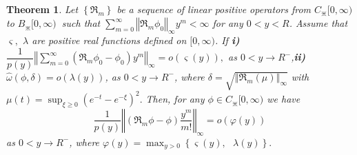 \documentclass{amsart}
\newtheorem{theorem}{Theorem}
\theoremstyle{plain}
\numberwithin{equation}{section}
\begin{document}
\begin{theorem}
\label{rate1} Let $\left \{  \Re_{m}\right \}  $ be a sequence of linear
positive operators from $C_{\divideontimes}[0,\infty)$ to $B_{\divideontimes
}[0,\infty)\ $ such that $%
{\displaystyle \sum \limits_{m=0}^{\infty}}
\left \Vert \Re_{m}\phi_{0}\right \Vert _{\infty}y^{m}<\infty$ for any $0<y<R$.
Assume that $\varsigma,$ $\lambda$ are positive real functions defined on
$[0,\infty)$. If \newline \textbf{i)} $\dfrac{1}{p(y)}\left \Vert
\displaystyle \sum_{m=0}^{\infty}(\Re_{m}\phi_{0}-\phi_{0})y^{m}\right \Vert
_{\infty}=o(\varsigma(y)),$ as $0<y\rightarrow R^{-}$,\newline \textbf{ii)
}$\hat{\omega}(\phi,\delta)=o(\lambda(y))$, as $0<y\rightarrow R^{-}$, where
$\delta=\sqrt{\left \Vert \Re_{m}\left(  \mu\right)  \right \Vert
_{\infty}}$ with $\mu(t)=\displaystyle \sup_{\xi \geq0}\left(
e^{-t}-e^{-\xi}\right)  ^{2}.$ Then, for any $\phi \in C_{\divideontimes
}[0,\infty)$ we have
\[
\frac{1}{p(y)}\left \Vert \left(  \Re_{m}\phi-\phi \right)  \frac{y^{m}}%
{m!}\right \Vert _{\infty}=o(\varphi(y))
\]
as $0<y\rightarrow R^{-}$, where $\varphi(y)=\displaystyle \max_{y>0}\left \{
\varsigma(y),\text{ }\lambda(y)\right \}  .$
\end{theorem}
\end{document}
